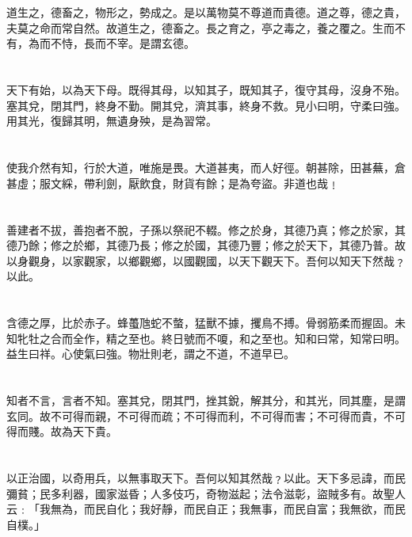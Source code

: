 \documentclass[11pt,oneside]{article}
\begin{document}
\section{}
\label{sec:orgheadline50}
道生之，德畜之，物形之，勢成之。是以萬物莫不尊道而貴德。道之尊，德之貴，夫莫之命而常自然。故道生之，德畜之。長之育之，亭之毒之，養之覆之。生而不有，為而不恃，長而不宰。是謂玄德。

\section{}
\label{sec:orgheadline51}
天下有始，以為天下母。既得其母，以知其子，既知其子，復守其母，沒身不殆。塞其兌，閉其門，終身不勤。開其兌，濟其事，終身不救。見小曰明，守柔曰強。用其光，復歸其明，無遺身殃，是為習常。

\section{}
\label{sec:orgheadline52}
使我介然有知，行於大道，唯施是畏。大道甚夷，而人好徑。朝甚除，田甚蕪，倉甚虛；服文綵，帶利劍，厭飲食，財貨有餘；是為夸盜。非道也哉﹗

\section{}
\label{sec:orgheadline53}
善建者不拔，善抱者不脫，子孫以祭祀不輟。修之於身，其德乃真；修之於家，其德乃餘；修之於鄉，其德乃長；修之於國，其德乃豐；修之於天下，其德乃普。故以身觀身，以家觀家，以鄉觀鄉，以國觀國，以天下觀天下。吾何以知天下然哉﹖以此。

\section{}
\label{sec:orgheadline54}
含德之厚，比於赤子。蜂蠆虺蛇不螫，猛獸不據，攫鳥不搏。骨弱筋柔而握固。未知牝牡之合而全作，精之至也。終日號而不嗄，和之至也。知和曰常，知常曰明。益生曰祥。心使氣曰強。物壯則老，謂之不道，不道早已。

\section{}
\label{sec:orgheadline55}
知者不言，言者不知。塞其兌，閉其門，挫其銳，解其分，和其光，同其塵，是謂玄同。故不可得而親，不可得而疏；不可得而利，不可得而害；不可得而貴，不可得而賤。故為天下貴。

\section{}
\label{sec:orgheadline56}
以正治國，以奇用兵，以無事取天下。吾何以知其然哉﹖以此。天下多忌諱，而民彌貧；民多利器，國家滋昏；人多伎巧，奇物滋起；法令滋彰，盜賊多有。故聖人云﹕「我無為，而民自化；我好靜，而民自正；我無事，而民自富；我無欲，而民自樸。」
\end{document}
